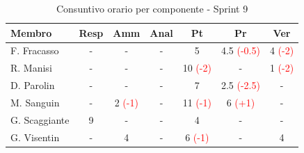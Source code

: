 \documentclass[a4paper,12pt]{article}
\begin{document}
\begin{table}[H] %
    \centering
    \renewcommand{\arraystretch}{1.4}
    \footnotesize
    \begin{tabularx}{\textwidth}{|l|C|C|C|C|C|C|}
        \hline
        \textbf{Membro} & \textbf{Resp} & \textbf{Amm} & \textbf{Anal} & \textbf{Pt} & \textbf{Pr} & \textbf{Ver} \\
        \hline
        F. Fracasso & - & - & - & 5 & 4.5 \textcolor{red}{(-0.5)} & 4 \textcolor{red}{(-2)} \\
        \hline
        R. Manisi & - & - & - & 10 \textcolor{red}{(-2)} & - & 1 \textcolor{red}{(-2)} \\
        \hline
        D. Parolin & - & - & - & 7 & 2.5 \textcolor{red}{(-2.5)} & - \\
        \hline
        M. Sanguin & - & 2 \textcolor{red}{(-1)} & - & 11 \textcolor{red}{(-1)} & 6 \textcolor{red}{(+1)} & - \\
        \hline
        G. Scaggiante & 9 & - & - & 4 & - & - \\
        \hline
        G. Visentin & - & 4 & - & 6 \textcolor{red}{(-1)} & - & 4 \\
        \hline
    \end{tabularx}
    \caption{Consuntivo orario per componente - Sprint 9}
    \label{tab:consuntivo_sprint9}
\end{table}
\end{document}
